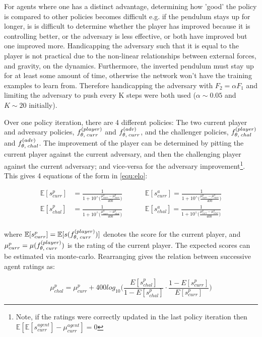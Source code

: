 \documentclass[../main.tex]{subfiles}
\begin{document}
For agents where one has a distinct advantage, determining how 'good' the policy is compared to other policies becomes difficult e.g. if the pendulum stays up for longer, is is difficult to determine whether the player has improved because it is controlling better, or the adversary is less effective, or both have improved but one improved more. Handicapping the adversary such that it is equal to the player is not practical due to the non-linear relationships between external forces, and gravity, on the dynamics. Furthermore, the inverted pendulum must stay up for at least some amount of time, otherwise the network won't have the training examples to learn from. Therefore handicapping the adversary with $F_2 = \alpha F_1$ and limiting the adversary to push every K steps were both used ($\alpha \sim 0.05$ and $K \sim 20$ initially).

Over one policy iteration, there are 4 different policies: The two current player and adversary policies, $f_{\theta, \; curr}^{(player)}$ and $f_{\theta, \; curr}^{(adv)}$, and the challenger policies,  $f_{\theta, \; chal}^{(player)}$ and $f_{\theta, \; chal}^{(adv)}$. The improvement of the player can be determined by pitting the current player against the current adversary, and then the challenging player against the current adversary; and vice-versa for the adversary improvement\footnote{Note, if the ratings were correctly updated in the last policy iteration then $\mathbb{E}[\mathbb{E}[s_{curr}^{agent}] - \mu_{curr}^{agent}] = 0$}. This gives 4 equations of the form in \cref{equ:elo}:

\begin{align}
   \mathbb{E}[s^p_{curr}] &= \frac{1}{1+10^\wedge \big( \frac{\mu^a_{curr} - \mu^p_{curr}}{400} \big)} \hspace{1cm} &\mathbb{E}[s^a_{curr}] = \frac{1}{1+10^\wedge \big( \frac{\mu^p_{curr} - \mu^a_{curr}}{400} \big)}\\
   \mathbb{E}[s^p_{chal}] &= \frac{1}{1+10^\wedge \big( \frac{\mu^a_{curr} - \mu^p_{chal}}{400} \big)} \hspace{1cm} &\mathbb{E}[s^a_{chal}] = \frac{1}{1+10^\wedge \big( \frac{\mu^p_{curr} - \mu^a_{chal}}{400} \big)}\\
\end{align}

where $\mathbb{E}[s^p_{curr}] = \mathbb{E}[s(f_{\theta, \; curr}^{(player)})]$ denotes the score for the current player, and $\mu^p_{curr} = \mu(f_{\theta, \; curr}^{(player)})$ is the rating of the current player. The expected scores can be estimated via monte-carlo. Rearranging gives the relation between successive agent ratings as:

\begin{equation}
   \mu^p_{chal} = \mu^p_{curr} + 400log_{10} \bigg( \frac{{E}[s^p_{chal}]}{1 - {E}[s^p_{chal}]} \cdot \frac{1 - {E}[s^p_{curr}]}{{E}[s^p_{curr}]}    \bigg)
\end{equation}


\appendix
\onlyinsubfile{}
\end{document}
